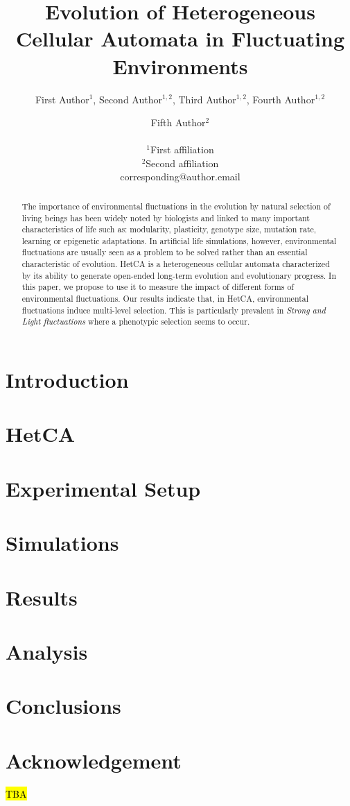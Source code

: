\documentclass[letterpaper]{article}
\title{Evolution of Heterogeneous Cellular Automata in Fluctuating Environments}
\author{First Author$^{1}$, Second Author$^{1,2}$, Third Author$^{1,2}$, Fourth Author$^{1,2}$ \and Fifth Author$^2$ \\
\mbox{}\\
$^1$First affiliation  \\
$^2$Second affiliation \\
corresponding@author.email}
\begin{document}
\maketitle

\begin{abstract}
The importance of environmental fluctuations in the evolution by natural selection of living beings has been widely noted by biologists and linked to many important characteristics of life such as: modularity, plasticity, genotype size, mutation rate, learning or epigenetic adaptations. In artificial life simulations, however, environmental fluctuations are usually seen as a problem to be solved rather than an essential characteristic of evolution. HetCA is a heterogeneous cellular automata characterized by its ability to generate open-ended long-term evolution and evolutionary progress. In this paper, we propose to use it to measure the impact of different forms of environmental fluctuations. Our results indicate that, in HetCA, environmental fluctuations induce multi-level selection. This is particularly prevalent in \emph{Strong and Light fluctuations} where a phenotypic selection seems to occur.
\end{abstract}

\section{Introduction}\label{sec:intro}


%

\section{HetCA}\label{sec:hetca)}


\section{Experimental Setup}\label{sec:exsetup}


\section{Simulations}\label{sec:method}


\section{Results}\label{sec:results}


\section{Analysis}


\section{Conclusions}\label{sec:conc}


\section{Acknowledgement}
\hl{TBA}


\end{document}
